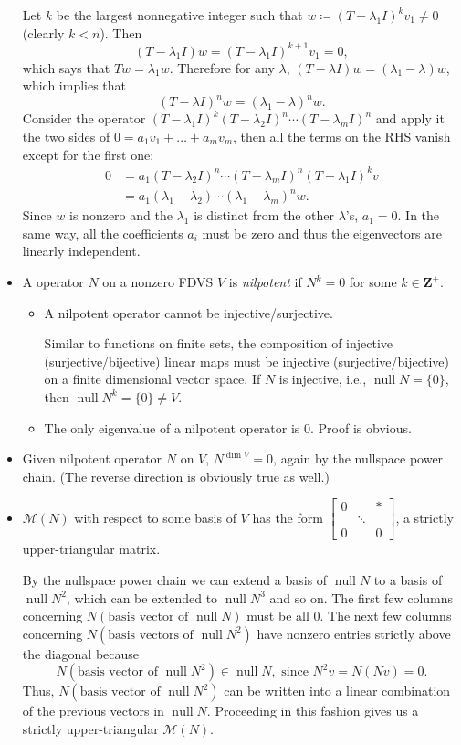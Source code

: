 \documentclass[11pt]{article}
\newcommand{\df}[1]{\textit{\textsf{#1}}}
\newcommand{\Z}{\mathbf{Z}}
\newcommand{\n}{\operatorname{null}}
\renewcommand{\d}{\dim}
\newcommand{\M}{\mathcal{M}}
\begin{document}
\begin{itemize}
    Let $k$ be the largest nonnegative integer such that $w \coloneqq (T-\lambda_1 I)^k v_1 \not= 0$ (clearly $k < n$). Then $$(T - \lambda_1 I)w = (T - \lambda_1 I)^{k+1} v_1 = 0,$$ which says that $Tw = \lambda_1 w$. Therefore for any $\lambda$, $(T-\lambda I) w = (\lambda_1 - \lambda) w$, which implies that $$(T-\lambda I)^n w = (\lambda_1 - \lambda)^n w.$$ Consider the operator $(T-\lambda_1 I)^k (T-\lambda_2 I)^n \cdots (T-\lambda_m I)^n$ and apply it the two sides of $0 = a_1v_1 + \dots + a_mv_m$, then all the terms on the RHS vanish except for the first one:
    \begin{align*}
    0 & = a_1 (T-\lambda_2 I)^n \cdots (T-\lambda_m I)^n (T-\lambda_1 I)^k v \\ & = a_1 (\lambda_1 -\lambda_2) \cdots (\lambda_1 - \lambda_m)^n w.
    \end{align*}
    Since $w$ is nonzero and the $\lambda_1$ is distinct from the other $\lambda$'s, $a_1 = 0$. In the same way, all the coefficients $a_i$ must be zero and thus the eigenvectors are linearly independent.
	\item A operator $N$ on a nonzero FDVS $V$ is \df{nilpotent} if $N^k = 0$ for some $k \in \Z^+$.
	\begin{itemize}
        \item A nilpotent operator cannot be injective/surjective.
        
        Similar to functions on finite sets, the composition of injective (surjective/bijective) linear maps must be injective (surjective/bijective) on a finite dimensional vector space. If $N$ is injective, i.e., $\n N = \{0\}$, then $\n N^k = \{0\} \neq V$.
	\item The only eigenvalue of a nilpotent operator is 0. Proof is obvious.
	\end{itemize}
	\item Given nilpotent operator $N$ on $V$, $N^{\d V} = 0$, again by the nullspace power chain. (The reverse direction is obviously true as well.)
	\item $\M(N)$ with respect to some basis of $V$ has the form $	\begin{bmatrix}
		0 & & \ast \\
		 & \ddots & \\
		 0 & & 0
	\end{bmatrix}$,
    a strictly upper-triangular matrix.
	
    By the nullspace power chain we can extend a basis of $\n N$ to a basis of $\n N^2$, which can be extended to $\n N^3$ and so on.
    The first few columns concerning $N(\text{basis vector of } \n N)$ must be all 0. The next few columns concerning $N(\text{basis vectors of } \n N^2)$ have nonzero entries strictly above the diagonal because $$N(\text{basis vector of } \n N^2) \in \n N, \text{ since }N^2v = N(Nv) = 0.$$ Thus, $N(\text{basis vector of } \n N^2)$ can be written into a linear combination of the previous vectors in $\n N$. Proceeding in this fashion gives us a strictly upper-triangular $\M(N)$.
\end{itemize}
\end{document}
